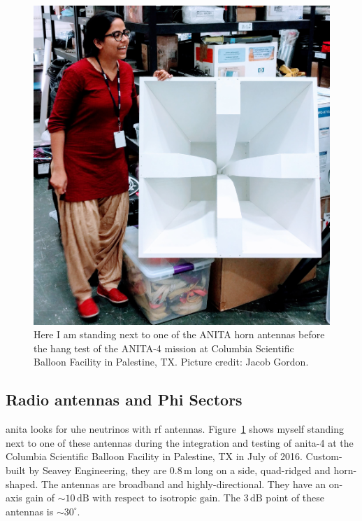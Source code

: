 \begin{figure}
\centering
\includegraphics[width=1.0\textwidth]{figures/anita_antenna_me.jpg}
\caption{Here I am standing next to one of the ANITA horn antennas before the hang test of the ANITA-4 mission at Columbia Scientific Balloon Facility in Palestine, TX. Picture credit: Jacob Gordon.}
\label{antenna}
\end{figure}

\subsection{Radio antennas and Phi Sectors}

\gls{anita} looks for \gls{uhe} neutrinos with \gls{rf} antennas.
Figure~\ref{antenna} shows myself standing next to one of these antennas during the integration and testing of \gls{anita}-4 at the Columbia Scientific Balloon Facility in Palestine, TX in July of 2016. Custom-built by Seavey Engineering, they
are $0.8\,\mbox{m}$ long on a side, quad-ridged and horn-shaped.
The antennas are broadband and highly-directional. 
They have an on-axis gain of $\sim10\,\mbox{dB with respect to isotropic gain}$.
The $3\,\mbox{dB}$ point of these antennas is $\sim30^{\circ}$.


